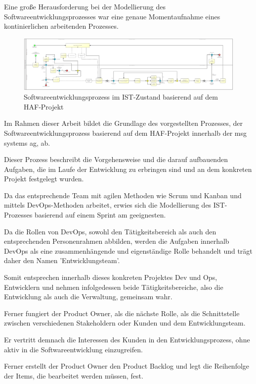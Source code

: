 Eine große Herausforderung bei der Modellierung des Softwareentwicklungsprozesses war eine genaue Momentaufnahme eines kontinierlichen arbeitenden Prozesses. 

\begin{figure}[p]
    \centering
    \includegraphics[angle=90, scale=0.6]{Bilder/IST-Prozess_neu.png}
    \caption{Softwareentwicklungsprozess im IST-Zustand basierend auf dem HAF-Projekt}
\end{figure}

Im Rahmen dieser Arbeit bildet die Grundlage des vorgestellten Prozesses, der Softwareentwicklungsprozess basierend auf dem HAF-Projekt innerhalb der msg systems ag, ab.

Dieser Prozess beschreibt die Vorgehensweise und die darauf aufbauenden Aufgaben, die im Laufe der Entwicklung zu erbringen sind und an dem konkreten Projekt festgelegt wurden.

Da das entsprechende Team mit agilen Methoden wie Scrum und Kanban und mittels DevOps-Methoden arbeitet, erwies sich die Modellierung des IST-Prozesses basierend auf einem Sprint am geeignesten. 

Da die Rollen von DevOps, sowohl den Tätigkeitsbereich als auch den entsprechenden Personenrahmen abbilden, werden die Aufgaben innerhalb DevOps als eine zusammenhängende und eigenständige Rolle behandelt und trägt daher den Namen 'Entwicklungsteam'.

Somit entsprechen innerhalb dieses konkreten Projektes Dev und Ops, Entwicklern und nehmen infolgedessen beide Tätigkeitsbereiche, also die Entwicklung als auch die Verwaltung, gemeinsam wahr.

Ferner fungiert der Product Owner, als die nächste Rolle, als die Schnittstelle zwischen verschiedenen Stakeholdern oder Kunden und dem Entwicklungsteam. 

Er vertritt demnach die Interessen des Kunden in den Entwicklungsprozess, ohne aktiv in die Softwareentwicklung einzugreifen.

Ferner erstellt der Product Owner den Product Backlog und legt die Reihenfolge der Items, die bearbeitet werden müssen, fest. 

